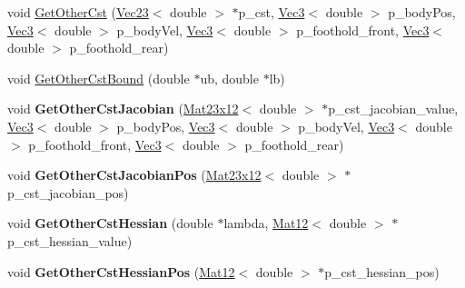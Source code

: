 \begin{DoxyCompactItemize}
\item 
void \hyperlink{classquadruped_1_1FH__constraints_aea30845107414bf505c976040efc5a0a}{Get\+Other\+Cst} (\hyperlink{cppTypes_8h_a7da3a7544c01fdbd4b509c1c25cc0b3d}{Vec23}$<$ double $>$ $\ast$p\+\_\+cst, \hyperlink{cppTypes_8h_a65c27bf97693676535dd0b30ea0ad399}{Vec3}$<$ double $>$ p\+\_\+body\+Pos, \hyperlink{cppTypes_8h_a65c27bf97693676535dd0b30ea0ad399}{Vec3}$<$ double $>$ p\+\_\+body\+Vel, \hyperlink{cppTypes_8h_a65c27bf97693676535dd0b30ea0ad399}{Vec3}$<$ double $>$ p\+\_\+foothold\+\_\+front, \hyperlink{cppTypes_8h_a65c27bf97693676535dd0b30ea0ad399}{Vec3}$<$ double $>$ p\+\_\+foothold\+\_\+rear)
\item 
void \hyperlink{classquadruped_1_1FH__constraints_ab13f56338e24832060644a96c86b15f7}{Get\+Other\+Cst\+Bound} (double $\ast$ub, double $\ast$lb)
\item 
\mbox{\label{classquadruped_1_1FH__constraints_ab0c2ee5e71f9859e966b53a61c2d4a91}} 
void {\bfseries Get\+Other\+Cst\+Jacobian} (\hyperlink{cppTypes_8h_af0bfab49b1dcef08b853aa7054f0782f}{Mat23x12}$<$ double $>$ $\ast$p\+\_\+cst\+\_\+jacobian\+\_\+value, \hyperlink{cppTypes_8h_a65c27bf97693676535dd0b30ea0ad399}{Vec3}$<$ double $>$ p\+\_\+body\+Pos, \hyperlink{cppTypes_8h_a65c27bf97693676535dd0b30ea0ad399}{Vec3}$<$ double $>$ p\+\_\+body\+Vel, \hyperlink{cppTypes_8h_a65c27bf97693676535dd0b30ea0ad399}{Vec3}$<$ double $>$ p\+\_\+foothold\+\_\+front, \hyperlink{cppTypes_8h_a65c27bf97693676535dd0b30ea0ad399}{Vec3}$<$ double $>$ p\+\_\+foothold\+\_\+rear)
\item 
\mbox{\label{classquadruped_1_1FH__constraints_a1decb386dbbad17d60fafe954839dcfd}} 
void {\bfseries Get\+Other\+Cst\+Jacobian\+Pos} (\hyperlink{cppTypes_8h_af0bfab49b1dcef08b853aa7054f0782f}{Mat23x12}$<$ double $>$ $\ast$p\+\_\+cst\+\_\+jacobian\+\_\+pos)
\item 
\mbox{\label{classquadruped_1_1FH__constraints_adeb1b721996fda4ddb0208a799fa7890}} 
void {\bfseries Get\+Other\+Cst\+Hessian} (double $\ast$lambda, \hyperlink{cppTypes_8h_a8f090be70b697c0532e0620504f70432}{Mat12}$<$ double $>$ $\ast$p\+\_\+cst\+\_\+hessian\+\_\+value)
\item 
\mbox{\label{classquadruped_1_1FH__constraints_a0dc66075943fa81ec350c032c9dc05d1}} 
void {\bfseries Get\+Other\+Cst\+Hessian\+Pos} (\hyperlink{cppTypes_8h_a8f090be70b697c0532e0620504f70432}{Mat12}$<$ double $>$ $\ast$p\+\_\+cst\+\_\+hessian\+\_\+pos)
\end{DoxyCompactItemize}


